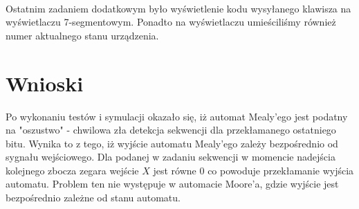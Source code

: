 \documentclass[wide,a4paper,titlepage,12pt] {article}
\begin{document}
\paragraph{}

Ostatnim zadaniem dodatkowym było wyświetlenie kodu wysyłanego klawisza na wyświetlaczu 7-segmentowym. Ponadto na wyświetlaczu umieściliśmy również numer aktualnego stanu urządzenia.

  \newpage
  \section{Wnioski}
  Po wykonaniu testów i symulacji okazało się, iż automat Mealy'ego jest podatny na "oszustwo" - chwilowa zła detekcja sekwencji dla przekłamanego ostatniego bitu. Wynika to z tego, iż wyjście automatu Mealy'ego zależy bezpośrednio od sygnału wejściowego. Dla podanej w zadaniu sekwencji w momencie nadejścia kolejnego zbocza zegara wejście $X$ jest równe $0$ co powoduje przekłamanie wyjścia automatu. Problem ten nie występuje w automacie Moore'a, gdzie wyjście jest bezpośrednio zależne od stanu automatu.
\end{document}
